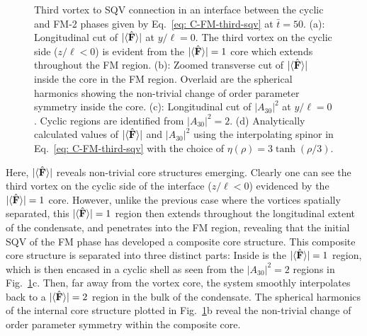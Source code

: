 \begin{figure}
    \caption[Dynamics of a one-third vortex to singly quantised vortex
    connection in a cyclic to ferromagnetic interface]
    {\label{fig: C-FM-third-SQV}Third vortex to SQV connection in an
    interface between the cyclic and FM-2 phases given by
    Eq.~\eqref{eq: C-FM-third-sqv} at \(\bar{t} = 50\).
    (a): Longitudinal cut of \(|\langle \hat{\vb{F}} \rangle | \) at \(y/\ell=0\).
    The third vortex on the cyclic side (\(z/\ell < 0\)) is evident from the
    \(|\langle \hat{\vb{F}} \rangle | = 1\) core which extends throughout the FM region.
    (b): Zoomed transverse cut of \(|\langle \hat{\vb{F}} \rangle | \) inside the core in the FM
    region.
    Overlaid are the spherical harmonics showing the non-trivial change
    of order parameter symmetry inside the core.
    (c): Longitudinal cut of \(|A_{30}|^2\) at \(y/\ell=0\).
    Cyclic regions are identified from \(|A_{30}|^2=2\).
    (d) Analytically calculated values of \(|\langle \hat{\vb{F}} \rangle | \) and \(|A_{30}|^2\)
    using the interpolating spinor in Eq.~\eqref{eq: C-FM-third-sqv} with the
    choice of \(\eta(\rho) = 3\tanh(\rho/3)\).}
\end{figure}
Here, \(|\langle \hat{\vb{F}} \rangle | \) reveals non-trivial core structures emerging.
Clearly one can see the third vortex on the cyclic side of the interface
(\(z/\ell < 0\)) evidenced by the \(|\langle \hat{\vb{F}} \rangle | = 1\) core.
However, unlike the previous case where the vortices spatially separated, this
\(|\langle \hat{\vb{F}} \rangle | = 1\) region then extends throughout the longitudinal extent of the
condensate, and penetrates into the FM region, revealing that the initial SQV of
the FM phase has developed a composite core structure.
This composite core structure is separated into three distinct parts:
Inside is the \(|\langle \hat{\vb{F}} \rangle | = 1\) region, which is then encased in a cyclic shell
as seen from the \(|A_{30}|^2=2\) regions in Fig.~\ref{fig: C-FM-third-SQV}c.
Then, far away from the vortex core, the system smoothly interpolates back to
a \(|\langle \hat{\vb{F}} \rangle | = 2\) region in the bulk of the condensate.
The spherical harmonics of the internal core structure plotted in
Fig.~\ref{fig: C-FM-third-SQV}b reveal the non-trivial change of order parameter
symmetry within the composite core.

